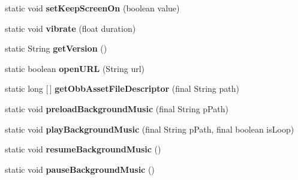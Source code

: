 \begin{DoxyCompactItemize}
static void {\bfseries set\+Keep\+Screen\+On} (boolean value)
\item 
\mbox{\label{classorg_1_1cocos2dx_1_1lib_1_1Cocos2dxHelper_a6a5f5bbe491018588c98a2919adc589a}} 
static void {\bfseries vibrate} (float duration)
\item 
\mbox{\label{classorg_1_1cocos2dx_1_1lib_1_1Cocos2dxHelper_af1239427d48b427e3b9c39e1a5aee094}} 
static String {\bfseries get\+Version} ()
\item 
\mbox{\label{classorg_1_1cocos2dx_1_1lib_1_1Cocos2dxHelper_a5954eb2605e81c3117668e30bd242100}} 
static boolean {\bfseries open\+U\+RL} (String url)
\item 
\mbox{\label{classorg_1_1cocos2dx_1_1lib_1_1Cocos2dxHelper_adb353e545d2de3b02be23c69343a51a9}} 
static long \mbox{[}$\,$\mbox{]} {\bfseries get\+Obb\+Asset\+File\+Descriptor} (final String path)
\item 
\mbox{\label{classorg_1_1cocos2dx_1_1lib_1_1Cocos2dxHelper_acad26aaaec46f97491179ba172ca22a3}} 
static void {\bfseries preload\+Background\+Music} (final String p\+Path)
\item 
\mbox{\label{classorg_1_1cocos2dx_1_1lib_1_1Cocos2dxHelper_a48649e5845399e53b6b9e626a047bca1}} 
static void {\bfseries play\+Background\+Music} (final String p\+Path, final boolean is\+Loop)
\item 
\mbox{\label{classorg_1_1cocos2dx_1_1lib_1_1Cocos2dxHelper_a88e3c0a5a161e74c4dc46fdbae584517}} 
static void {\bfseries resume\+Background\+Music} ()
\item 
\mbox{\label{classorg_1_1cocos2dx_1_1lib_1_1Cocos2dxHelper_ab16080cfbf32edd70d9958b605dd2b00}} 
static void {\bfseries pause\+Background\+Music} ()
\item 
\mbox{\label{classorg_1_1cocos2dx_1_1lib_1_1Cocos2dxHelper_a06f298c54c67bca87dc741794cd5bf2c}} 

\end{DoxyCompactItemize}
